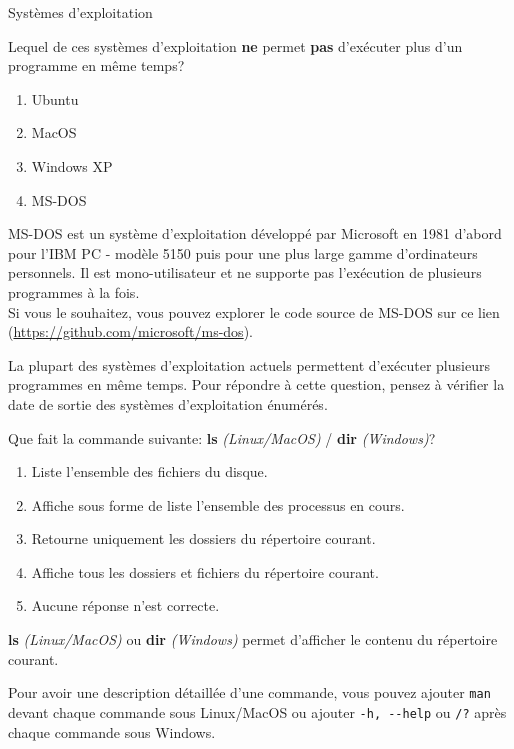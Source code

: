 \begin{section}{Systèmes d'exploitation}
\begin{Exercice}[3 minutes]
    Lequel de ces systèmes d'exploitation \textbf{ne} permet \textbf{pas} d'exécuter plus d'un programme en même temps?
    \begin{enumerate}
        \item Ubuntu
        \item MacOS
        \item Windows XP
        \item MS-DOS
    \end{enumerate}
    \begin{solution}
        MS-DOS est un système d'exploitation développé par Microsoft en 1981 d'abord pour l'IBM PC - modèle 5150 puis pour une plus large gamme d'ordinateurs personnels. Il est mono-utilisateur et ne supporte pas l'exécution de plusieurs programmes à la fois.
        \\
        Si vous le souhaitez, vous pouvez explorer le code source de MS-DOS sur ce lien (\url{https://github.com/microsoft/ms-dos}). 
    \end{solution}
    \begin{conseil}
        La plupart des systèmes d'exploitation actuels permettent d'exécuter plusieurs programmes en même temps. Pour répondre à cette question, pensez à vérifier la date de sortie des systèmes d'exploitation énumérés.
    \end{conseil}
\end{Exercice}

\begin{Exercice}[5 minutes]
        Que fait la commande suivante: \textbf{ls} \textit{(Linux/MacOS)} / \textbf{dir} \textit{(Windows)}?
        \begin{enumerate}
            \item Liste l'ensemble des fichiers du disque.
            \item Affiche sous forme de liste l'ensemble des processus en cours.
            \item Retourne uniquement les dossiers du répertoire courant.
            \item Affiche tous les dossiers et fichiers du répertoire courant.
            \item Aucune réponse n'est correcte.
        \end{enumerate}
        \begin{solution}
            \textbf{ls} \textit{(Linux/MacOS)} ou \textbf{dir} \textit{(Windows)} permet d'afficher le contenu du répertoire courant.
        \end{solution}
        \begin{conseil}
            Pour avoir une description détaillée d'une commande, vous pouvez ajouter \lstinline{man} devant chaque commande sous Linux/MacOS ou ajouter \lstinline{-h, --help} ou \lstinline{/?} après chaque commande sous Windows.
        \end{conseil}
    \end{Exercice}


\end{section}
